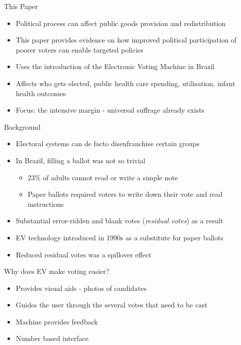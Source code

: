 \documentclass[11pt,notes=hide,aspectratio=169,mathserif]{beamer}
\begin{document}
\begin{frame}{This Paper}

\begin{itemize}
\item Political process can affect public goods provision and redistribution
\item This paper provides evidence on how improved political participation of poorer voters can enable targeted policies 
\item Uses the introduction of the Electronic Voting Machine in Brazil 
\item Affects who gets elected, public health care spending, utilisation, infant health outcomes
\item Focus: the intensive margin - universal suffrage already exists
\end{itemize}
\end{frame}

\begin{frame}{Background}

\begin{itemize}
\item Electoral systems can de facto disenfranchise certain groups
\item In Brazil, filling a ballot was not so trivial 
\begin{itemize}
    \item 23\% of adults cannot read or write a simple note 
    \item Paper ballots required voters to write down their vote and read instructions
\end{itemize}
\item Substantial error-ridden and blank votes (\textit{residual votes}) as a result 
\item EV technology introduced in 1990s as a substitute for paper ballots
\item Reduced residual votes was a spillover effect
\end{itemize}
\end{frame}

\begin{frame}{Why does EV make voting easier?}

\begin{itemize}
\item Provides visual aids - photos of candidates
\item Guides the user through the several votes that need to be cast 
\item Machine provides feedback 
\item Number based interface 
\end{itemize}
\end{frame}
\end{document}
